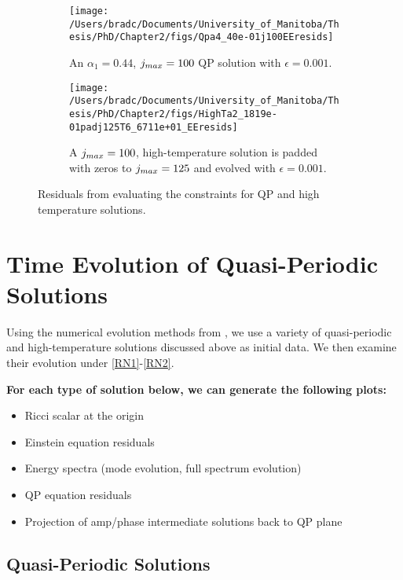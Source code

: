 \documentclass[../PhD.tex]{subfiles}
\begin{document}
\begin{figure}[h]
	\centering
	\begin{subfigure}[t]{0.45\textwidth}
		\texttt{[image: /Users/bradc/Documents/University\_of\_Manitoba/Thesis/PhD/Chapter2/figs/Qpa4\_40e-01j100EEresids]}
		\caption{An $\alpha_1 = 0.44$, $j_{max} = 100$ QP solution with $\epsilon = 0.001$.}
		\label{fig:QPEEresid}
	\end{subfigure}
	\;
	\begin{subfigure}[t]{0.45\textwidth}
		\texttt{[image: /Users/bradc/Documents/University\_of\_Manitoba/Thesis/PhD/Chapter2/figs/HighTa2\_1819e-01padj125T6\_6711e+01\_EEresids]}
		\caption{A $j_{max} = 100$, high-temperature solution is padded with zeros to $j_{max} = 125$ and evolved with $\epsilon = 0.001$.}
		\label{fig:highTEEresid}
	\end{subfigure}
	\caption[Absolute and relative residuals for low- and high-temperature QP solutions]{Residuals from evaluating the constraints for QP and high temperature solutions.}
	\label{fig:EEresids}
\end{figure}


\section{Time Evolution of Quasi-Periodic Solutions}
\label{sec: time evolution}

Using the numerical evolution methods from \cite{1606.02712}, we use a variety of quasi-periodic and high-temperature solutions discussed above as initial data. We then examine their evolution under \eqref{RN1}-\eqref{RN2}.

{\bf For each type of solution below, we can generate the following plots:
\begin{itemize}
\item Ricci scalar at the origin
\item Einstein equation residuals
\item Energy spectra (mode evolution, full spectrum evolution)
\item QP equation residuals 
\item Projection of amp/phase intermediate solutions back to QP plane
\end{itemize}
}


\subsection{Quasi-Periodic Solutions}
\end{document}

